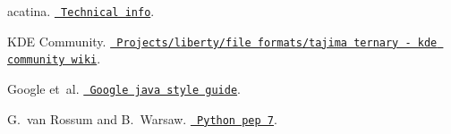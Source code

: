 
\begin{DoxyDescription}
\item[\label{citelist_CITEREF_acatina}%
\Hypertarget{citelist_CITEREF_acatina}%
\mbox{[}1\mbox{]}]acatina. \href{http://www.achatina.de/sewing/main/TECHNICL.HTM}{\texttt{ Technical info}}.


\item[\label{citelist_CITEREF_kde_tajima}%
\Hypertarget{citelist_CITEREF_kde_tajima}%
\mbox{[}2\mbox{]}]KDE Community. \href{https://community.kde.org/Projects/Liberty/File_Formats/Tajima_Ternary}{\texttt{ Projects/liberty/file formats/tajima ternary -\/ kde community wiki}}.


\item[\label{citelist_CITEREF_google_java}%
\Hypertarget{citelist_CITEREF_google_java}%
\mbox{[}3\mbox{]}]Google et~al. \href{https://google.github.io/styleguide/javaguide.html}{\texttt{ Google java style guide}}.


\item[\label{citelist_CITEREF_pep7}%
\Hypertarget{citelist_CITEREF_pep7}%
\mbox{[}4\mbox{]}]G.~van Rossum and B.~Warsaw. \href{https://peps.python.org/pep-0007/}{\texttt{ Python pep 7}}.


\end{DoxyDescription}